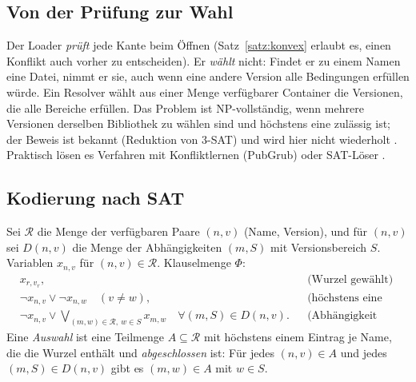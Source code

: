 \documentclass[a4paper,12pt,twoside]{report}
\DeclareRobustCommand{\_}{\ifmmode\mbox{\textunderscore}\else\textunderscore\allowbreak{}\fi}
\theoremstyle{definition}
\begin{document}
\subsection{Von der Prüfung zur Wahl}
Der Loader \emph{prüft} jede Kante beim Öffnen (Satz~\ref{satz:konvex} erlaubt es, einen Konflikt auch vorher zu entscheiden). Er \emph{wählt} nicht: Findet er zu einem Namen eine Datei, nimmt er sie, auch wenn eine andere Version alle Bedingungen erfüllen würde. Ein Resolver wählt aus einer Menge verfügbarer Container die Versionen, die alle Bereiche erfüllen. Das Problem ist NP-vollständig, wenn mehrere Versionen derselben Bibliothek zu wählen sind und höchstens eine zulässig ist; der Beweis ist bekannt (Reduktion von 3-SAT) und wird hier nicht wiederholt \cite{cox2016}. Praktisch lösen es Verfahren mit Konfliktlernen (PubGrub) oder SAT-Löser \cite{een2003}.

\subsection{Kodierung nach SAT}
\label{sec:aus_sat}
Sei $\mathcal R$ die Menge der verfügbaren Paare $(n,v)$ (Name, Version), und für $(n,v)$ sei $D(n,v)$ die Menge der Abhängigkeiten $(m,S)$ mit Versionsbereich $S$. Variablen $x_{n,v}$ für $(n,v)\in\mathcal R$. Klauselmenge $\Phi$:
\begin{align*}
	&x_{r,v_r}, &&\text{(Wurzel gewählt)}\\
	&\neg x_{n,v}\vee\neg x_{n,w}\quad(v\ne w), &&\text{(höchstens eine Version je Name)}\\
	&\neg x_{n,v}\vee\bigvee_{(m,w)\in\mathcal R,\ w\in S}x_{m,w}\quad\forall (m,S)\in D(n,v). &&\text{(Abhängigkeit erfüllt)}
\end{align*}
Eine \emph{Auswahl} ist eine Teilmenge $A\subseteq\mathcal R$ mit höchstens einem Eintrag je Name, die die Wurzel enthält und \emph{abgeschlossen} ist: Für jedes $(n,v)\in A$ und jedes $(m,S)\in D(n,v)$ gibt es $(m,w)\in A$ mit $w\in S$.
\end{document}
